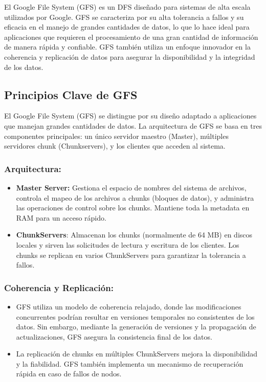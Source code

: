El Google File System (GFS) es un DFS diseñado para sistemas de alta escala utilizados por Google. GFS se caracteriza por su alta tolerancia a fallos y su eficacia en el manejo de grandes cantidades de datos, lo que lo hace ideal para aplicaciones que requieren el procesamiento de una gran cantidad de información de manera rápida y confiable. GFS también utiliza un enfoque innovador en la coherencia y replicación de datos para asegurar la disponibilidad y la integridad de los datos.

\subsection{Principios Clave de GFS}

El Google File System (GFS) se distingue por su diseño adaptado a aplicaciones que manejan grandes cantidades de datos. La arquitectura de GFS se basa en tres componentes principales: un único servidor maestro (Master), múltiples servidores chunk (Chunkservers), y los clientes que acceden al sistema.

\subsubsection{Arquitectura:}

\begin{itemize}
    \item \textbf{Master Server:} Gestiona el espacio de nombres del sistema de archivos, controla el mapeo de los archivos a chunks (bloques de datos), y administra las operaciones de control sobre los chunks. Mantiene toda la metadata en RAM para un acceso rápido.
    \item \textbf{ChunkServers}: Almacenan los chunks (normalmente de 64 MB) en discos locales y sirven las solicitudes de lectura y escritura de los clientes. Los chunks se replican en varios ChunkServers para garantizar la tolerancia a fallos.
\end{itemize}

\subsubsection{Coherencia y Replicación:}

\begin{itemize}
    \item GFS utiliza un modelo de coherencia relajado, donde las modificaciones concurrentes podrían resultar en versiones temporales no consistentes de los datos. Sin embargo, mediante la generación de versiones y la propagación de actualizaciones, GFS asegura la consistencia final de los datos.
    \item La replicación de chunks en múltiples ChunkServers mejora la disponibilidad y la fiabilidad. GFS también implementa un mecanismo de recuperación rápida en caso de fallos de nodos.
\end{itemize}

